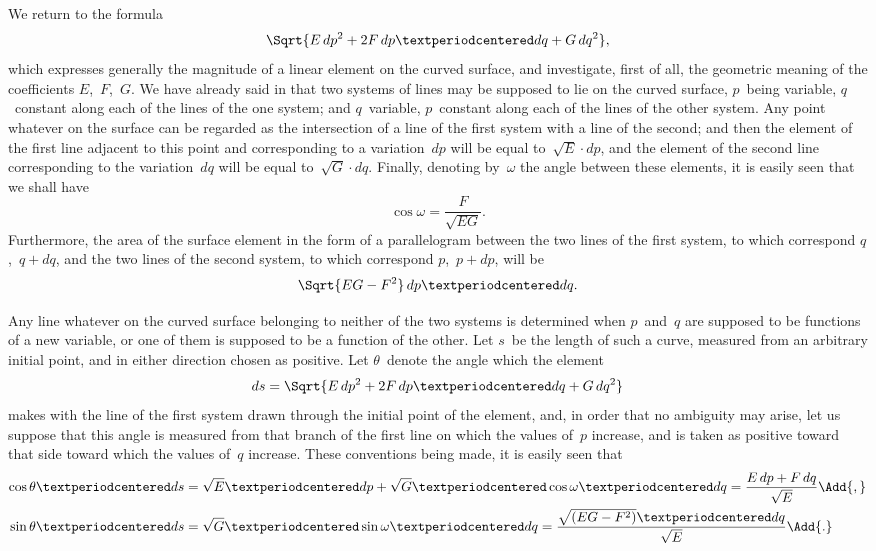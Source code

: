 
We return to the formula
\[
\Sqrt{E\, dp^{2} + 2F\, dp·dq + G\, dq^{2}},
\]
which expresses generally the magnitude of a linear element on the curved surface,
and investigate, first of all, the geometric meaning of the coefficients $E$,~$F$,~$G$. We
have already said in  that two systems of lines may be supposed to lie on the
curved surface, $p$~being variable, $q$~constant along each of the lines of the one system;
and $q$~variable, $p$~constant along each of the lines of the other system. Any point
whatever on the surface can be regarded as the intersection of a line of the first
system with a line of the second; and then the element of the first line adjacent to
this point and corresponding to a variation~$dp$ will be equal to~$\sqrt{E}·dp$, and the
element of the second line corresponding to the variation~$dq$ will be equal to~$\sqrt{G}·dq$.
Finally, denoting by~$\omega$ the angle between these elements, it is easily seen that we
shall have
\[
\cos \omega = \frac{F}{\sqrt{EG}}.
\]
Furthermore, the area of the surface element in the form of a parallelogram between
the two lines of the first system, to which correspond $q$,~$q + dq$, and the two lines of
the second system, to which correspond $p$,~$p + dp$, will be
\[
\Sqrt{EG - F^{2}}\, dp·dq.
\]

Any line whatever on the curved surface belonging to neither of the two systems
is determined when $p$~and~$q$ are supposed to be functions of a new variable, or
one of them is supposed to be a function of the other. Let $s$~be the length of such
a curve, measured from an arbitrary initial point, and in either direction chosen as
positive. Let $\theta$~denote the angle which the element
\[
ds = \Sqrt{E\, dp^{2} + 2F\, dp·dq + G\, dq^{2}}
\]
makes with the line of the first system drawn through the initial point of the element,
and, in order that no ambiguity may arise, let us suppose that this angle is
measured from that branch of the first line on which the values of~$p$ increase, and is
taken as positive toward that side toward which the values of~$q$ increase. These conventions
being made, it is easily seen that
\begin{align*}
\cos \theta·ds &= \sqrt{E}·dp + \sqrt{G}·\cos \omega·dq
  = \frac{E\, dp + F\, dq}{\sqrt{E}}\Add{,} \\
\sin \theta·ds &= \sqrt{G}·\sin \omega·dq
  = \frac{\sqrt{(EG - F^{2})}·dq}{\sqrt{E}}\Add{.}
\end{align*}




